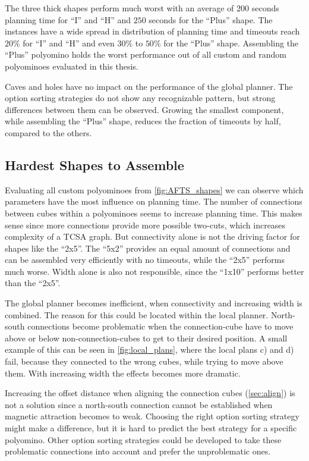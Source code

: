 The three thick shapes perform much worst with an average of $200$ seconds planning time for ``I'' and ``H'' and $250$ seconds for the ``Plus'' shape.
The instances have a wide spread in distribution of planning time and timeouts reach $20\%$ for ``I'' and ``H'' and even $30\%$ to $50\%$ for the ``Plus'' shape.
Assembling the ``Plus'' polyomino holds the worst performance out of all custom and random polyominoes evaluated in this thesis.

Caves and holes have no impact on the performance of the global planner.
The option sorting strategies do not show any recognizable pattern, but strong differences between them can be observed.
Growing the smallest component, while assembling the ``Plus'' shape, reduces the fraction of timeouts by half, compared to the others.


\subsection{Hardest Shapes to Assemble}

Evaluating all custom polyominoes from \autoref{fig:AFTS_shapes} we can observe which parameters have the most influence on planning time.
The number of connections between cubes within a polyominoes seems to increase planning time.
This makes sense since more connections provide more possible two-cuts, which increases complexity of a TCSA graph.
But connectivity alone is not the driving factor for shapes like the ``2x5''.
The ``5x2'' provides an equal amount of connections and can be assembled very efficiently with no timeouts, while the ``2x5'' performs much worse.
Width alone is also not responsible, since the ``1x10'' performs better than the ``2x5''.

The global planner becomes inefficient, when connectivity and increasing width is combined.
The reason for this could be located within the local planner.
North-south connections become problematic when the connection-cube have to move above or below non-connection-cubes to get to their desired position.
A small example of this can be seen in \autoref{fig:local_plans}, where the local plans c) and d) fail, because they connected to the wrong cubes, while trying to move above them.
With increasing width the effects becomes more dramatic.

Increasing the offset distance when aligning the connection cubes (\autoref{sec:align}) is not a solution since a north-south connection cannot be established when magnetic attraction becomes to weak.
Choosing the right option sorting strategy might make a difference, but it is hard to predict the best strategy for a specific polyomino.
Other option sorting strategies could be developed to take these problematic connections into account and prefer the unproblematic ones.



